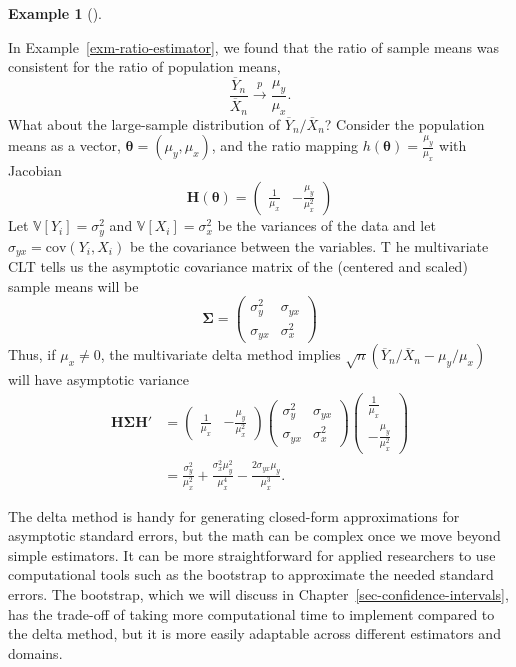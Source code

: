 \documentclass[
  13pt,
  letterpaper,
  DIV=11,
  numbers=noendperiod]{scrreprt}
\newcommand{\mb}{\bm}
\newcommand{\V}{\mathbb{V}}
\newcommand{\cov}{\text{cov}}
\newcommand{\Xbar}{\overline{X}}
\newcommand{\Ybar}{\overline{Y}}
\newcommand{\inprob}{\overset{p}{\to}}
\theoremstyle{plain}
\theoremstyle{plain}
\theoremstyle{definition}
\theoremstyle{definition}
\newtheorem{example}{Example}[chapter]
\theoremstyle{remark}
\begin{document}
\begin{example}[]\protect\hypertarget{exm-ratio-delta}{}\label{exm-ratio-delta}

In Example~\ref{exm-ratio-estimator}, we found that the ratio of sample
means was consistent for the ratio of population means, \[
\frac{\Ybar_n}{\Xbar_n} \inprob \frac{\mu_y}{\mu_x}.
\] What about the large-sample distribution of \(\Ybar_n/\Xbar_n\)?
Consider the population means as a vector,
\(\mb{\theta} = (\mu_y, \mu_x)\), and the ratio mapping
\(h(\mb{\theta}) = \frac{\mu_y}{\mu_x}\) with Jacobian \[
\mb{H}(\mb{\theta}) = \begin{pmatrix}
\frac{1}{\mu_x} & -\frac{\mu_y}{\mu_x^2}
\end{pmatrix}
\] Let \(\V[Y_i] = \sigma^2_y\) and \(\V[X_i] = \sigma^2_x\) be the
variances of the data and let \(\sigma_{yx} = \cov(Y_i, X_i)\) be the
covariance between the variables. T he multivariate CLT tells us the
asymptotic covariance matrix of the (centered and scaled) sample means
will be \[
\mb{\Sigma} = \begin{pmatrix}
\sigma^2_y & \sigma_{yx} \\
\sigma_{yx} & \sigma^2_x
\end{pmatrix}
\] Thus, if \(\mu_x \neq 0\), the multivariate delta method implies
\(\sqrt{n}(\Ybar_n / \Xbar_n - \mu_y / \mu_x)\) will have asymptotic
variance \[
\begin{aligned}
\mb{H}\mb{\Sigma}\mb{H}' &= \begin{pmatrix} \frac{1}{\mu_x} & -\frac{\mu_y}{\mu_x^2}\end{pmatrix} \begin{pmatrix}
\sigma^2_y & \sigma_{yx} \\
\sigma_{yx} & \sigma^2_x
\end{pmatrix} \begin{pmatrix} \frac{1}{\mu_x}\\ -\frac{\mu_y}{\mu_x^2}\end{pmatrix} \\ & = \frac{\sigma^2_y}{\mu_x^2} + \frac{\sigma^2_x\mu^2_y}{\mu_x^4} - \frac{2\sigma_{yx}\mu_y}{\mu_x^3}.
\end{aligned}
\]

\end{example}

The delta method is handy for generating closed-form approximations for
asymptotic standard errors, but the math can be complex once we move
beyond simple estimators. It can be more straightforward for applied
researchers to use computational tools such as the bootstrap to
approximate the needed standard errors. The bootstrap, which we will
discuss in Chapter~\ref{sec-confidence-intervals}, has the trade-off of
taking more computational time to implement compared to the delta
method, but it is more easily adaptable across different estimators and
domains.
\end{document}

